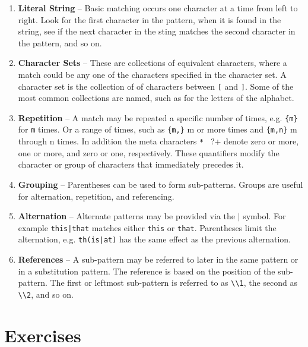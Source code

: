\begin{enumerate}
\item \textbf{Literal String} -- Basic matching occurs one character at a time from left to right.  Look for the first character in the pattern, when it is found in the string, see if the next character in the sting matches the second character in the pattern, and so on.
  
\item \textbf{Character Sets} -- These are collections of equivalent characters, where a match could be any one of the characters specified in the character set. A character set is the collection of of characters between \verb+[+ and \verb+]+.  Some of the most common collections are named, such as  for the letters of the alphabet.

\item \textbf{Repetition} -- A match may be repeated a specific number of times, e.g. \verb+{m}+ for \verb+m+ times. Or a range of times, such as \verb+{m,}+ m or more times and \verb+{m,n}+ m through n times. In addition the meta characters \verb+* + ?+ denote zero or more, one or more, and zero or one, respectively.  These quantifiers modify the character or group of characters that immediately precedes it.
 
\item \textbf{Grouping} -- Parentheses can be used to form sub-patterns.  Groups are useful for alternation, repetition, and referencing.

\item \textbf{Alternation} -- Alternate patterns may be provided via the $|$ symbol. For example \verb+this|that+ matches either \verb+this+ or \verb+that+. Parentheses limit the alternation, e.g. \verb+th(is|at)+ has the same effect as the previous alternation.

\item \textbf{References} -- A sub-pattern may be referred to later in the same pattern or in a substitution pattern.  The reference is based on the position of the sub-pattern.  The first or leftmost sub-pattern is referred to as \verb+\\1+, the second as \verb+\\2+, and so on.  
\end{enumerate}


\section{Exercises}

